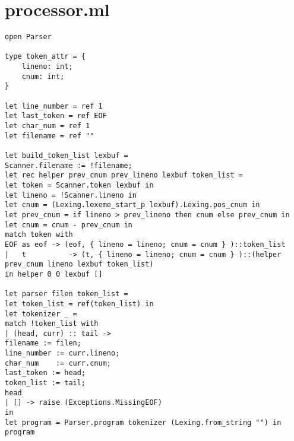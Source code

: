 \section{processor.ml}
\begin{verbatim}
open Parser

type token_attr = {
	lineno: int;
	cnum: int;
}

let line_number = ref 1
let last_token = ref EOF
let char_num = ref 1
let filename = ref ""

let build_token_list lexbuf =
Scanner.filename := !filename;
let rec helper prev_cnum prev_lineno lexbuf token_list =
let token = Scanner.token lexbuf in
let lineno = !Scanner.lineno in
let cnum = (Lexing.lexeme_start_p lexbuf).Lexing.pos_cnum in
let prev_cnum = if lineno > prev_lineno then cnum else prev_cnum in
let cnum = cnum - prev_cnum in
match token with
EOF as eof -> (eof, { lineno = lineno; cnum = cnum } )::token_list
|   t          -> (t, { lineno = lineno; cnum = cnum } )::(helper prev_cnum lineno lexbuf token_list)
in helper 0 0 lexbuf []

let parser filen token_list =
let token_list = ref(token_list) in
let tokenizer _ =
match !token_list with
| (head, curr) :: tail -> 
filename := filen;
line_number := curr.lineno;
char_num    := curr.cnum;
last_token := head;
token_list := tail;
head
| [] -> raise (Exceptions.MissingEOF)
in
let program = Parser.program tokenizer (Lexing.from_string "") in
program
\end{verbatim}	